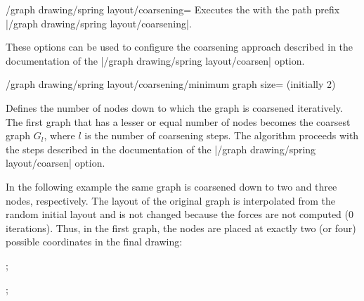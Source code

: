 \begin{key}{/graph drawing/spring layout/coarsening=}
  Executes the  with the path prefix 
  |/graph drawing/spring layout/coarsening|.

  These options can be used to configure the coarsening approach
  described in the documentation of the 
  |/graph drawing/spring layout/coarsen| option.
\end{key}

\begin{key}{/graph drawing/spring layout/coarsening/minimum graph
  size= (initially 2)}

  Defines the number of nodes down to which the graph is coarsened
  iteratively. The first graph that has a lesser or equal number of
  nodes becomes the coarsest graph $G_l$, where $l$ is the number of
  coarsening steps. The algorithm proceeds with the steps described in
  the documentation of the |/graph drawing/spring layout/coarsen|
  option.

  In the following example the same graph is coarsened down to two
  and three nodes, respectively. The layout of the original graph is 
  interpolated from the random initial layout and is not changed
  because the forces are not computed (0 iterations). Thus, in the 
  first graph, the nodes are placed at exactly two (or four) 
  possible coordinates in the final drawing:
  \begin{codeexample}[width=5.5cm]
\tikz {};

\tikz {};
  \end{codeexample}
\end{key}

